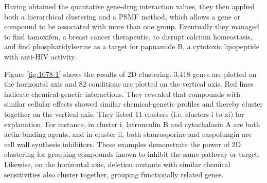 \documentclass[12pt,conference,compsocconf]{../IEEEtran}
\begin{document}
Having obtained the quantative gene-drug interaction values, they then applied both a hierarchical clustering and a PSMF method, which allows a gene or compound to be associated with more than one group. Eventually they managed to find tamoxifen, a breast cancer therapeutic, to disrupt calcium homeostasis, and find phosphatidylserine as a target for papuamide B, a cytotoxic lipopeptide with anti-HIV activity.

Figure \ref{fig:1078-1} shows the results of 2D clustering. 3,418 genes are plotted on the horizontal axis and 82 conditions are plotted on the vertical axis. Red lines indicate chemical-genetic interactions. They revealed that compounds with similar cellular effects showed similar chemical-genetic profiles and thereby cluster together on the vertical axis. They listed 11 clusters (i.e. clusters i to xi) for explanation. For instance, in cluster i, latrunculin B and cytochalasin A are both actin binding agents, and in cluster ii, both staurosporine and caspofungin are cell wall synthesis inhibitors. These examples demonstrate the power of 2D clustering for grouping compounds known to inhibit the same pathway or target. Likewise, on the horizontal axis, deletion mutants with similar chemical sensitivities also cluster together, grouping functionally related genes.
\end{document}
